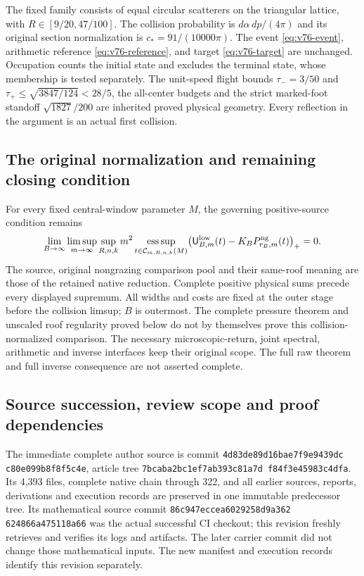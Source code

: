 \documentclass[11pt,reqno]{amsart}
\numberwithin{equation}{section}
\theoremstyle{definition}\newtheorem{definition}[theorem]{Definition}
\theoremstyle{remark}\newtheorem{remark}[theorem]{Remark}
\begin{document}
The fixed family consists of equal circular scatterers on the
triangular lattice, with $R\in[9/20,47/100]$. The collision probability
is $d\alpha\,dp/(4\pi)$ and its original section normalization is
$c_*=91/(10000\pi)$. The event \eqref{eq:v76-event}, arithmetic
reference \eqref{eq:v76-reference}, and target \eqref{eq:v76-target}
are unchanged. Occupation counts the initial state and excludes
the terminal state, whose membership is tested separately.
The unit-speed flight bounds
$\tau_-=3/50$ and $\tau_+\le\sqrt{3847/124}<28/5$, the all-center
budgets and the strict marked-foot standoff $\sqrt{1827}/200$
are inherited proved physical geometry. Every reflection in the
argument is an actual first collision.



\subsection*{The original normalization and remaining closing condition}
For every fixed central-window parameter $M$, the governing
positive-source condition remains
\begin{equation}\label{eq:sc-original-obligation}
 \lim_{B\to\infty}\limsup_{m\to\infty}\sup_{R,n,k}
 m^2\operatorname*{ess\,sup}_{t\in\mathcal C_{m,R,n,k}(M)}
 \bigl(\mathsf U^{\rm low}_{B,m}(t)
                    -K_BP^{\rm ng}_{r_B,m}(t)\bigr)_+=0.
\end{equation}
The source, original nongrazing comparison pool and their same-roof
meaning are those of the retained native reduction. Complete positive
physical sums precede every displayed supremum. All widths and costs
are fixed at the outer stage before the collision limsup; $B$ is
outermost. The complete pressure theorem and unscaled roof regularity
proved below do not by themselves prove this collision-normalized
comparison. The necessary microscopic-return, joint spectral,
arithmetic and inverse interfaces keep their original scope. The
full raw theorem and full inverse consequence are not asserted complete.

\subsection*{Source succession, review scope and proof dependencies}
The immediate complete author source is commit
\texttt{4d83de89\allowbreak d16bae7f\allowbreak9e9439dc\allowbreak
c80e099b\allowbreak8f8f5c4e}, article tree
\texttt{7bcaba2b\allowbreak c1ef7ab3\allowbreak93c81a7d\allowbreak
f84f3e45\allowbreak983c4dfa}.
Its 4,393 files, complete native chain through 322, and all earlier
sources, reports, derivations and execution records are preserved in
one immutable predecessor tree. Its mathematical source commit
\texttt{86c947ec\allowbreak cea60292\allowbreak58d9a362\allowbreak
624866a4\allowbreak75118a66} was the actual successful CI checkout;
this revision freshly retrieves and verifies its logs and artifacts.
The later carrier commit did not change those mathematical inputs.
The new manifest and execution records identify this revision separately.
\end{document}
